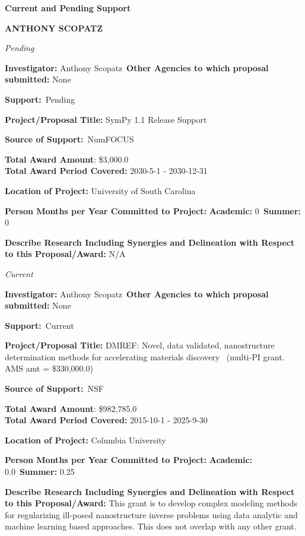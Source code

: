 \documentclass[prl,tighten,amsmath,amssymb,floatfix]{revtex4-1}
\begin{document}
\textbf{Current and Pending Support}

\textbf{ANTHONY SCOPATZ}
\vskip 14pt


\textit{Pending}

\vskip 12pt\noindent
\textbf{Investigator:} Anthony Scopatz\
\textbf{Other Agencies to which proposal submitted:}
None

\textbf{Support:}\ Pending

\textbf{Project/Proposal Title:}  SymPy 1.1 Release Support

\textbf{Source of Support:}\
NumFOCUS

\textbf{Total Award Amount}:
\$3,000.0\\
\textbf{ Total Award Period Covered:}
2030-5-1 - 2030-12-31

\textbf{Location of Project:} University of South Carolina

\textbf{Person Months per Year Committed to Project:}
\textbf{Academic:} 0\
\textbf{Summer:} 0

\textbf{Describe Research Including Synergies and Delineation with
Respect to this Proposal/Award:} N/A

\vskip 14pt


\textit{Current}

\vskip 12pt\noindent
\textbf{Investigator:} Anthony Scopatz\
\textbf{Other Agencies to which proposal submitted:}
None

\textbf{Support:}\ Current

\textbf{Project/Proposal Title:}  DMREF: Novel, data validated, nanostructure determination methods for accelerating materials discovery
\ (multi-PI grant.  AMS
amt = \$330,000.0)


\textbf{Source of Support:}\
NSF

\textbf{Total Award Amount}:
\$982,785.0\\
\textbf{ Total Award Period Covered:}
2015-10-1 - 2025-9-30

\textbf{Location of Project:} Columbia University

\textbf{Person Months per Year Committed to Project:}
\textbf{Academic:} 0.0\
\textbf{Summer:} 0.25

\textbf{Describe Research Including Synergies and Delineation with
Respect to this Proposal/Award:} This grant is to develop complex modeling methods for regularizing ill-posed nanostructure inverse problems using data analytic and machine learning based approaches. This does not overlap with any other grant.

\vskip 14pt
\end{document}
